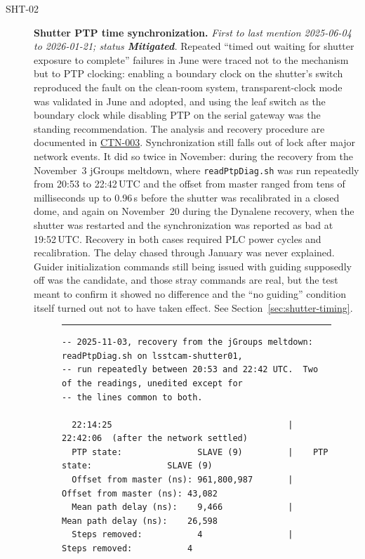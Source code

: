 \begin{description}
\item[SHT-02]\label{iss:SHT-02} \textbf{Shutter PTP time synchronization.}
  \emph{First to last mention 2025-06-04 to 2026-01-21; status \textcolor{stmit}{\textbf{Mitigated}}.}
  Repeated ``timed out waiting for shutter exposure to complete'' failures in June were traced not to the mechanism but to PTP clocking: enabling a boundary clock on the shutter's switch reproduced the fault on the clean-room system, transparent-clock mode was validated in June and adopted, and using the leaf switch as the boundary clock while disabling PTP on the serial gateway was the standing recommendation.  The analysis and recovery procedure are documented in \href{https://ctn-003.lsst.io}{CTN-003}.  Synchronization still falls out of lock after major network events.  It did so twice in November: during the recovery from the November~3 jGroups meltdown, where \texttt{readPtpDiag.sh} was run repeatedly from 20:53 to 22:42\,UTC and the offset from master ranged from tens of milliseconds up to 0.96\,s before the shutter was recalibrated in a closed dome, and again on November~20 during the Dynalene recovery, when the shutter was restarted and the synchronization was reported as bad at 19:52\,UTC.  Recovery in both cases required PLC power cycles and recalibration.  The delay chased through January was never explained.  Guider initialization commands still being issued with guiding supposedly off was the candidate, and those stray commands are real, but the test meant to confirm it showed no difference and the ``no guiding'' condition itself turned out not to have taken effect. See Section~\ref{sec:shutter-timing}.

\begin{figure}[H]
\centering
\begin{minipage}{\textwidth}
\hrule\vspace{4pt}
\begingroup\scriptsize
\begin{verbatim}
-- 2025-11-03, recovery from the jGroups meltdown: readPtpDiag.sh on lsstcam-shutter01,
-- run repeatedly between 20:53 and 22:42 UTC.  Two of the readings, unedited except for
-- the lines common to both.

  22:14:25                                   |    22:42:06  (after the network settled)
  PTP state:               SLAVE (9)         |    PTP state:               SLAVE (9)
  Offset from master (ns): 961,800,987       |    Offset from master (ns): 43,082
  Mean path delay (ns):    9,466             |    Mean path delay (ns):    26,598
  Steps removed:           4                 |    Steps removed:           4


\end{verbatim}
\end{minipage}
\end{figure}
\end{description}
